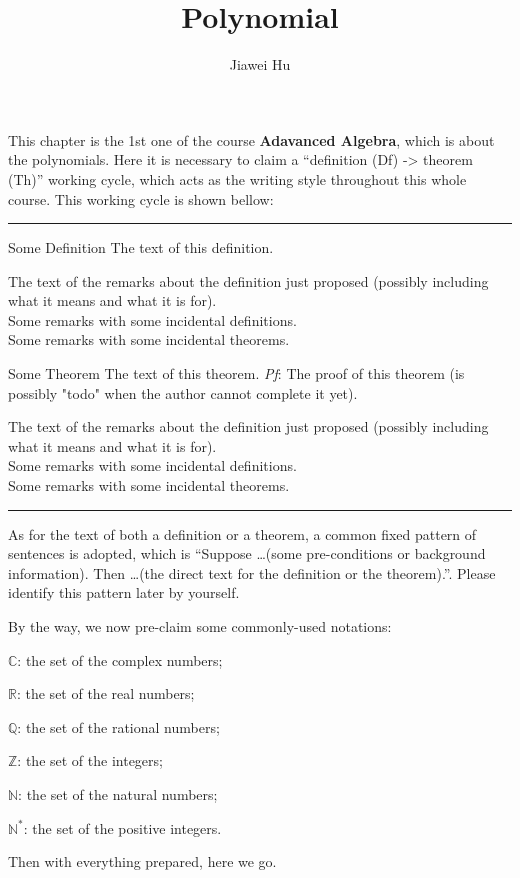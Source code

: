 \documentclass{article}
\title{\LARGE \textbf{Polynomial}}
\author{\large Jiawei Hu}
\begin{document}
\maketitle

This chapter is the 1st one of the course \textbf{Adavanced Algebra}, which is about the polynomials. Here it is necessary to claim a ``definition (Df) -> theorem (Th)'' working cycle, which acts as the writing style throughout this whole course. This working cycle is shown bellow:

\noindent\rule{\textwidth}{2pt}
\begin{Df}{Some Definition}
    The text of this definition.
\end{Df}

\begin{Rmk}{}
    The text of the remarks about the definition just proposed (possibly including what it means and what it is for).\\
    \textcolor{Df}{Some remarks with some incidental definitions.}\\
    \textcolor{Th}{Some remarks with some incidental theorems.}
\end{Rmk}

\begin{Th}{Some Theorem}
    The text of this theorem.
    \tcblower
    \textit{Pf}: The proof of this theorem (is possibly "todo" when the author cannot complete it yet).
\end{Th}

\begin{Rmk}{}
    The text of the remarks about the definition just proposed (possibly including what it means and what it is for).\\
    \textcolor{Df}{Some remarks with some incidental definitions.}\\
    \textcolor{Th}{Some remarks with some incidental theorems.}
\end{Rmk}
\noindent\rule{\textwidth}{2pt}
As for the text of both a definition or a theorem, a common fixed pattern of sentences is adopted, which is ``Suppose \dots (some pre-conditions or background information). Then \dots (the direct text for the definition or the theorem).''. Please identify this pattern later by yourself. 

By the way, we now pre-claim some commonly-used notations:
\begin{compactenum}
    \item $\mathbb{C}$: the set of the complex numbers;
    \item $\mathbb{R}$: the set of the real numbers;
    \item $\mathbb{Q}$: the set of the rational numbers;
    \item $\mathbb{Z}$: the set of the integers;
    \item $\mathbb{N}$: the set of the natural numbers;
    \item $\mathbb{N^\ast}$: the set of the positive integers.
\end{compactenum} 
Then with everything prepared, here we go.
\end{document}
